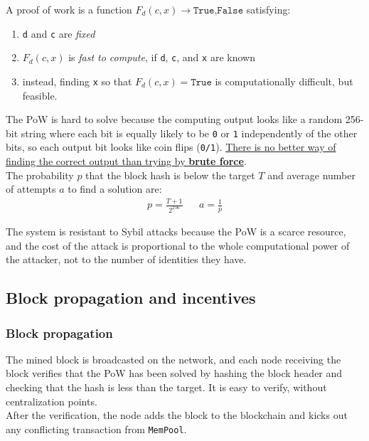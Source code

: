 \begin{definition}
   {A proof of work is a function $F_d(c,x) \rightarrow {\texttt{True,False}}$ satisfying:\ns
   \begin{enumerate}
      \item \texttt{d} and \texttt{c} are \textit{fixed}
      \item $F_d(c,x)$ is \textit{fast to compute}, if \texttt{d}, \texttt{c}, and \texttt{x} are known
      \item instead, finding \texttt{x} so that $F_d(c,x) = \texttt{True}$ is computationally difficult, but feasible.
   \end{enumerate}}
\end{definition}

The PoW is hard to solve because the computing output looks like a random 256-bit string where each bit is equally likely to be \texttt{0} or \texttt{1} independently of the other bits, so each output bit looks like coin flips (\texttt{0/1}).
\ul{There is no better way of finding the correct output than trying by \textbf{brute force}}.\\
The probability $p$ that the block hash is below the target $T$ and average number of attempts $a$ to find a solution are:
\begin{align*}
   p=\frac{T+1}{2^{256}} & & a=\frac{1}{p}
\end{align*}

The system is resistant to Sybil attacks because the PoW is a scarce resource, and the cost of the attack is proportional to the whole computational power of the attacker, not to the number of identities they have.


\subsection{Block propagation and incentives}
\subsubsection{Block propagation}
The mined block is broadcasted on the network, and each node receiving the block verifies that the PoW has been solved by hashing the block header and checking that the hash is less than the target.
It is easy to verify, without centralization points.\\
After the verification, the node adds the block to the blockchain and kicks out any conflicting transaction from \texttt{MemPool}.

